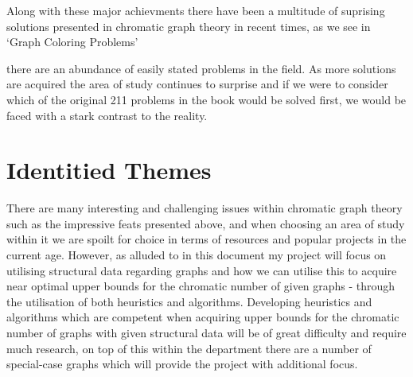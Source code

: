 \documentclass[12pt, a4paper]{article}
\begin{document}
Along with these major achievments there have been a multitude of suprising solutions presented in chromatic graph theory in recent times, as we see in `Graph Coloring Problems' {\cite{problems1} there are an abundance of easily stated problems in the field. As more solutions are acquired the area of study continues to surprise and if we were to consider which of the original 211 problems in the book would be solved first, we would be faced with a stark contrast to the reality.
\section*{Identitied Themes}
\hspace{\parindent} There are many interesting and challenging issues within chromatic graph theory such as the impressive feats presented above, and when choosing an area of study within it we are spoilt for choice in terms of resources and popular projects in the current age. However, as alluded to in this document my project will focus on utilising structural data regarding graphs and how we can utilise this to acquire near optimal upper bounds for the chromatic number of given graphs - through the utilisation of both heuristics and algorithms. Developing heuristics and algorithms which are competent when acquiring upper bounds for the chromatic number of graphs with given structural data will be of great difficulty and require much research, on top of this within the department there are a number of special-case graphs which will provide the project with additional focus.
}
\end{document}
